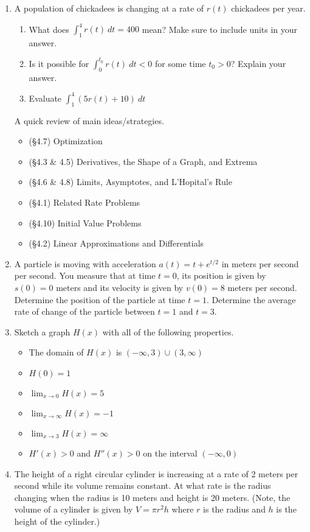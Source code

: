 \documentclass[11pt,fleqn]{article}
\def\ds{\displaystyle}
\begin{document}
\begin{enumerate}
\item A population of chickadees is changing at a rate of $r(t)$ chickadees per year. 
	\begin{enumerate}
	\item What does $\ds{\int_1^4 r(t) \: dt=400}$ mean? Make sure to include units in your answer.\\
	\vfill
	\item Is it possible for $\ds{\int_0^{t_0} r(t) \: dt<0}$ for some time $t_0 >0$? Explain your answer.
	\vfill
	\item Evaluate $\ds{\int_1^4 (5 r(t)+10) \: dt}$
	\vfill
	\end{enumerate}
\newpage
A quick review of main ideas/strategies.
	\begin{itemize}
	\item (\S 4.7) Optimization
	\item (\S 4.3 \& 4.5) Derivatives, the Shape of a Graph, and Extrema
	\item (\S 4.6 \& 4.8) Limits, Asymptotes, and L'Hopital's Rule
	\item (\S 4.1) Related Rate Problems
	\item (\S 4.10) Initial Value Problems
	\item (\S 4.2) Linear Approximations and Differentials  
	\end{itemize}
\item A particle is moving with acceleration $a(t)=t+e^{t/2}$ in meters per second per second. You measure that at time $t=0$, its position is given by $s(0)=0$ meters and its velocity is given by $v(0)=8$ meters per second. Determine the position of the particle at time $t=1.$ Determine the average rate of change of the particle between $t=1$ and $t=3$.
\vfill
\item Sketch a graph $H(x)$ with all of the following properties.\\
\begin{itemize}
	\item The domain of $H(x)$ is $(-\infty,3) \cup (3,\infty)$
	\item $H(0)=1$
	\item $\displaystyle \lim_{x \to 0} H(x)=5$
	\item $\displaystyle \lim_{x \to \infty} H(x)=-1$
	\item $\displaystyle \lim_{x \to 3} H(x)=\infty$
	\item $H'(x) >0$ and $H''(x) >0$ on the interval $(-\infty,0)$
\end{itemize}
\newpage
\item The height of a right circular cylinder is increasing at a rate of 2 meters per second while its volume remains constant. At what rate is the radius changing when the radius is 10 meters and height is 20 meters. (Note, the volume of a cylinder is given by $V=\pi r^2 h$ where $r$ is the radius and $h$ is the height of the cylinder.)

\end{enumerate}
\end{document}
